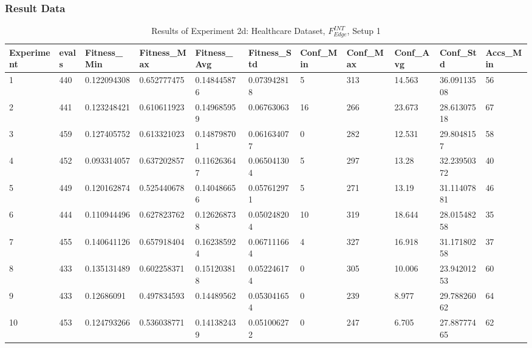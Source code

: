 		\subsubsection{Result Data}
		\label{sec:A_Exp2d_Data}
			\begin{table}[H]
				\caption{Results of Experiment 2d: Healthcare Dataset, $F_{Edge}^{INT}$, Setup 1}
				\label{tab:A_Exp2d_Data}
				\begin{adjustbox}{max width=380pt,keepaspectratio,angle=90}
					\begin{tabular}{|l|l|l|l|l|l|l|l|l|l|l|}
						\rowcolor[HTML]{EFEFEF} 
						\hline
						Experiment & evals & Fitness\_Min & Fitness\_Max & Fitness\_Avg & Fitness\_Std & Conf\_Min & Conf\_Max & Conf\_Avg & Conf\_Std   & Accs\_Min \\ \hline
						1          & 440   & 0.122094308  & 0.652777475  & 0.148445876  & 0.073942818  & 5         & 313       & 14.563    & 36.09113508 & 56        \\ \hline
						2          & 441   & 0.123248421  & 0.610611923  & 0.149685959  & 0.06763063   & 16        & 266       & 23.673    & 28.61307518 & 67        \\ \hline
						3          & 459   & 0.127405752  & 0.613321023  & 0.148798701  & 0.061634077  & 0         & 282       & 12.531    & 29.8048157  & 58        \\ \hline
						4          & 452   & 0.093314057  & 0.637202857  & 0.116263647  & 0.065041304  & 5         & 297       & 13.28     & 32.23950372 & 40        \\ \hline
						5          & 449   & 0.120162874  & 0.525440678  & 0.140486656  & 0.057612971  & 5         & 271       & 13.19     & 31.11407881 & 46        \\ \hline
						6          & 444   & 0.110944496  & 0.627823762  & 0.126268738  & 0.050248204  & 10        & 319       & 18.644    & 28.01548258 & 35        \\ \hline
						7          & 455   & 0.140641126  & 0.657918404  & 0.162385924  & 0.067111664  & 4         & 327       & 16.918    & 31.17180258 & 37        \\ \hline
						8          & 433   & 0.135131489  & 0.602258371  & 0.151203818  & 0.052246174  & 0         & 305       & 10.006    & 23.94201253 & 60        \\ \hline
						9          & 433   & 0.12686091   & 0.497834593  & 0.14489562   & 0.053041654  & 0         & 239       & 8.977     & 29.78826062 & 64        \\ \hline
						10         & 453   & 0.124793266  & 0.536038771  & 0.141382439  & 0.051006272  & 0         & 247       & 6.705     & 27.88777465 & 62        \\ \hline\hline

\end{tabular}
\end{adjustbox}
\end{table}

